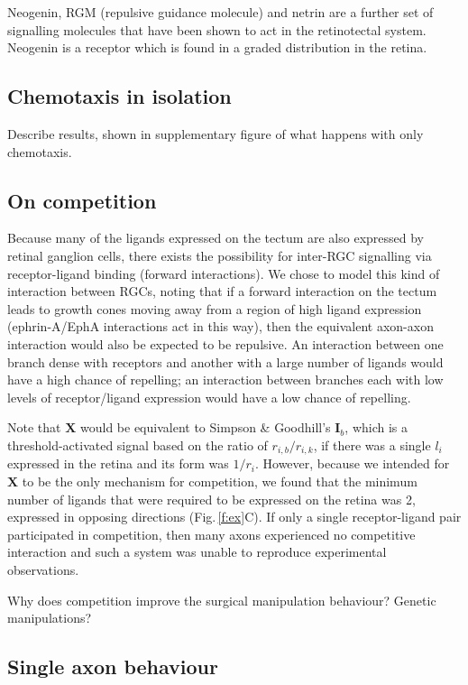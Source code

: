 \documentclass[11pt, a4paper]{article}
\begin{document}
Neogenin, RGM (repulsive guidance molecule) and netrin are a further set of signalling molecules that have been shown to act in the retinotectal system.  Neogenin is a receptor which is found in a graded distribution in the retina.

\subsection*{Chemotaxis in isolation}


Describe results, shown in supplementary figure of what happens with only chemotaxis.

\subsection*{On competition}

Because many of the ligands expressed on the tectum are also expressed by retinal ganglion cells, there exists the possibility for inter-RGC signalling via receptor-ligand binding (forward interactions).
We chose to model this kind of interaction between RGCs, noting that if a forward interaction on the tectum leads to growth cones moving away from a region of high ligand expression (ephrin-A/EphA interactions act in this way), then the equivalent axon-axon interaction would also be expected to be repulsive. An interaction between one branch dense with receptors and another with a large number of ligands would have a high chance of repelling; an interaction between branches each with low levels of receptor/ligand expression would have a low chance of repelling.


Note that $\mathbf{X}$ would be equivalent to Simpson \& Goodhill's $\mathbf{I}_b$, which is a threshold-activated signal based on the ratio of $r_{i,b}/r_{i,k}$, if there was a single $l_i$ expressed in the retina and its form was $1/r_i$.
However, because we intended for $\mathbf{X}$ to be the only mechanism for competition, we found that the minimum number of ligands that were required to be expressed on the retina was 2, expressed in opposing directions (Fig.\,\ref{f:ex}C). If only a single receptor-ligand pair participated in competition, then many axons experienced no competitive interaction and such a system was unable to reproduce experimental observations.

Why does competition improve the surgical manipulation behaviour? Genetic manipulations?

\subsection*{Single axon behaviour}
\end{document}
